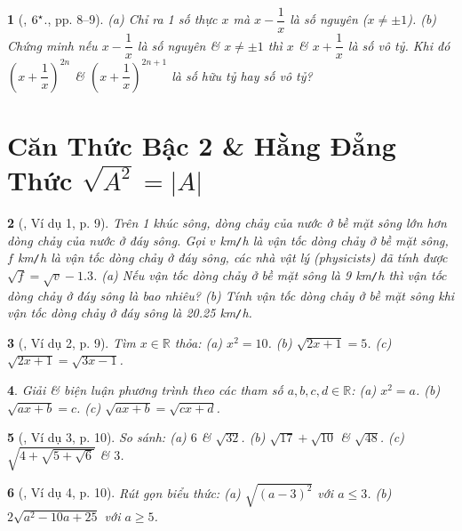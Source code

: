 \documentclass{article}
\newtheorem{baitoan}{}%
\begin{document}
\begin{baitoan}[\cite{Binh_Toan_9_tap_1}, $\rm6^\star$., pp. 8--9]
	(a) Chỉ ra 1 số thực $x$ mà $x - \dfrac{1}{x}$ là số nguyên ($x\ne\pm1$). (b) Chứng minh nếu $x - \dfrac{1}{x}$ là số nguyên \& $x\ne\pm1$ thì $x$ \& $x + \dfrac{1}{x}$ là số vô tỷ. Khi đó $\left(x + \dfrac{1}{x}\right)^{2n}$ \& $\left(x + \dfrac{1}{x}\right)^{2n+1}$ là số hữu tỷ hay số vô tỷ?
\end{baitoan}


\section{Căn Thức Bậc 2 \& Hằng Đẳng Thức $\sqrt{A^2} = |A|$}

\begin{baitoan}[\cite{Binh_boi_duong_Toan_9_tap_1}, Ví dụ 1, p. 9]
	Trên 1 khúc sông, dòng chảy của nước ở bề mặt sông lớn hơn dòng chảy của nước ở đáy sông. Gọi $v$ {\rm km{\tt/}h} là vận tốc dòng chảy ở bề mặt sông, $f$ {\rm km{\tt/}h} là vận tốc dòng chảy ở đáy sông, các nhà vật lý (physicists) đã tính được $\sqrt{f} = \sqrt{v} - 1.3$. (a) Nếu vận tốc dòng chảy ở bề mặt sông là {\rm9 km{\tt/}h} thì vận tốc dòng chảy ở đáy sông là bao nhiêu? (b) Tính vận tốc dòng chảy ở bề mặt sông khi vận tốc dòng chảy ở đáy sông là {\rm20.25 km{\tt/}h}.
\end{baitoan}

\begin{baitoan}[\cite{Binh_boi_duong_Toan_9_tap_1}, Ví dụ 2, p. 9]
	Tìm $x\in\mathbb{R}$ thỏa: (a) $x^2 = 10$. (b) $\sqrt{2x + 1} = 5$. (c) $\sqrt{2x + 1} = \sqrt{3x - 1}$.
\end{baitoan}

\begin{baitoan}
	Giải \& biện luận phương trình theo các tham số $a,b,c,d\in\mathbb{R}$: (a) $x^2 = a$. (b) $\sqrt{ax + b} = c$. (c) $\sqrt{ax + b} = \sqrt{cx + d}$.
\end{baitoan}

\begin{baitoan}[\cite{Binh_boi_duong_Toan_9_tap_1}, Ví dụ 3, p. 10]
	So sánh: (a) $6$ \& $\sqrt{32}$. (b) $\sqrt{17} + \sqrt{10}$ \& $\sqrt{48}$. (c) $\sqrt{4 + \sqrt{5 + \sqrt{6}}}$ \& $3$.
\end{baitoan}

\begin{baitoan}[\cite{Binh_boi_duong_Toan_9_tap_1}, Ví dụ 4, p. 10]
	Rút gọn biểu thức: (a) $\sqrt{(a - 3)^2}$ với $a\le3$. (b) $2\sqrt{a^2 - 10a + 25}$ với $a\ge5$.
\end{baitoan}
\end{document}

